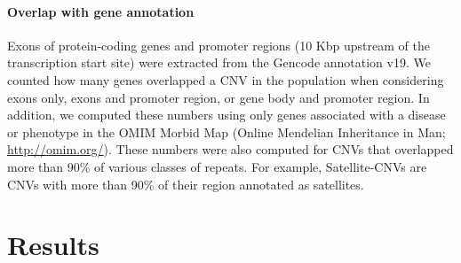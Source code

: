 \paragraph{Overlap with gene annotation}
Exons of protein-coding genes and promoter regions (10 Kbp upstream of the transcription start site) were extracted from the Gencode annotation v19.
We counted how many genes overlapped a CNV in the population when considering exons only, exons and promoter region, or gene body and promoter region.
In addition, we computed these numbers using only genes associated with a disease or phenotype in the OMIM Morbid Map (Online Mendelian Inheritance in Man; \url{http://omim.org/}).
These numbers were also computed for CNVs that overlapped more than 90\% of various classes of repeats.
For example, Satellite-CNVs are CNVs with more than 90\% of their region annotated as satellites.

\section{Results}

